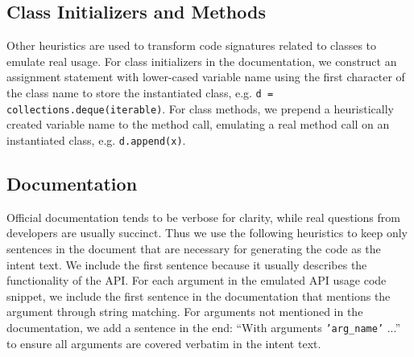 \documentclass[11pt,a4paper]{article}
\begin{document}
\subsection{Class Initializers and Methods} 
Other heuristics are used to transform code signatures related to classes to emulate real usage.
For class initializers in the documentation, we construct an assignment statement with lower-cased variable name using the first character of the class name to store the instantiated class, e.g. \texttt{d = collections.deque(iterable)}.
For class methods, we prepend a heuristically created variable name to the method call, emulating a real method call on an instantiated class, e.g. \texttt{d.append(x)}.


\subsection{Documentation} 
Official documentation tends to be verbose for clarity, while real questions from developers are usually succinct.
Thus we use the following heuristics to keep only sentences in the document that are necessary for generating the code as the intent text.
We include the first sentence because it usually describes the functionality of the API.
For each argument in the emulated API usage code snippet, we include the first sentence in the documentation that mentions the argument through string matching.
For arguments not mentioned in the documentation, we add a sentence in the end: ``With arguments \texttt{'arg\_name'} ...'' to ensure all arguments are covered verbatim in the intent text.
\end{document}
